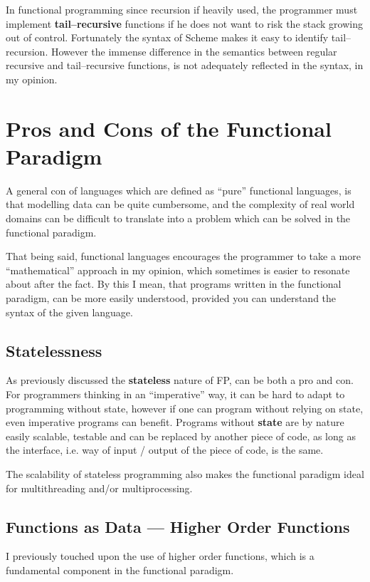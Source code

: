 \medskip
In functional programming since recursion if heavily used, the programmer must implement \textbf{tail--recursive} functions if he does not want to risk the stack growing out of control.
Fortunately the syntax of Scheme makes it easy to identify tail--recursion.
However the immense difference in the semantics between regular recursive and tail--recursive functions, is not adequately reflected in the syntax, in my opinion.

\section{Pros and Cons of the Functional Paradigm}
A general con of languages which are defined as ``pure'' functional languages,
is that modelling data can be quite cumbersome, and the complexity of real world domains
can be difficult to translate into a problem which can be solved in the functional paradigm.

That being said, functional languages encourages the programmer to take a more ``mathematical'' approach in my opinion, which sometimes is easier to resonate about after the fact.
By this I mean, that programs written in the functional paradigm, can be more easily understood, provided you can understand the syntax of the given language.

\subsection{Statelessness}
As previously discussed the \textbf{stateless} nature of FP, can be both a pro and con.
For programmers thinking in an ``imperative'' way, it can be hard to adapt to programming without state,
however if one can program without relying on state, even imperative programs can benefit.
Programs without \textbf{state} are by nature easily scalable, testable and can be replaced by another piece of code,
as long as the interface, i.e. way of input / output of the piece of code, is the same.

The scalability of stateless programming also makes the functional paradigm ideal for multithreading and/or multiprocessing.

\subsection{Functions as Data --- Higher Order Functions}
I previously touched upon the use of higher order functions, which is a fundamental component in the functional paradigm.

